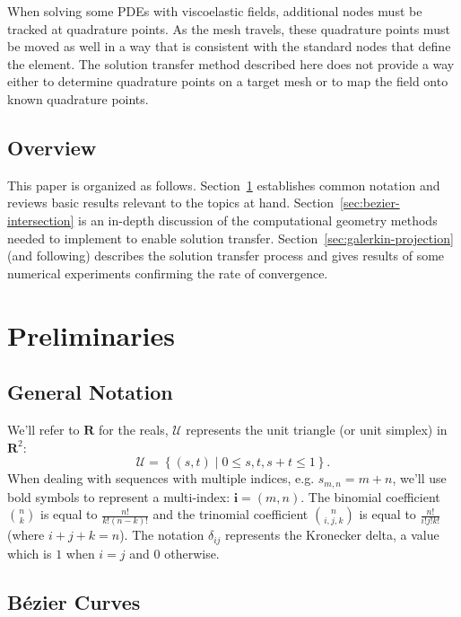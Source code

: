 \documentclass[letterpaper,10pt]{article}
\theoremstyle{definition}
\newcommand{\reals}{\mathbf{R}}
\newcommand{\utri}{\mathcal{U}}
\begin{document}
When solving some PDEs with viscoelastic fields, additional nodes must be
tracked at quadrature points. As the mesh travels, these quadrature points
must be moved as well in a way that is consistent with the standard
nodes that define the element. The solution transfer method described here
does not provide a way either to determine quadrature points on a
target mesh or to map the field onto known quadrature points.

\subsection{Overview}

This paper is organized as follows. Section~\ref{sec:preliminaries}
establishes common notation and reviews basic results relevant to the
topics at hand. Section~\ref{sec:bezier-intersection} is an
in-depth discussion of the computational geometry methods needed
to implement to enable solution transfer. Section~\ref{sec:galerkin-projection}
(and following)
describes the solution transfer process and gives results of some
numerical experiments confirming the rate of convergence.

\section{Preliminaries}\label{sec:preliminaries}

\subsection{General Notation}

We'll refer to \(\reals\) for the reals, \(\utri\) represents
the unit triangle (or unit simplex) in \(\reals^2\):
\begin{equation}
\utri = \left\{(s, t) \mid 0 \leq s, t, s + t \leq 1\right\}.
\end{equation}
When dealing with sequences with multiple indices, e.g.
\(s_{m, n} = m + n\), we'll use bold symbols to represent
a multi-index: \(\bm{i} = (m, n)\).
The binomial coefficient
\(\binom{n}{k}\) is equal to \(\frac{n!}{k! (n - k)!}\) and the trinomial
coefficient \(\binom{n}{i, j, k}\) is equal to \(\frac{n!}{i! j! k!}\)
(where \(i + j + k = n\)). The notation \(\delta_{ij}\) represents the
Kronecker delta, a value which is \(1\) when \(i = j\) and \(0\)
otherwise.

\subsection{B\'{e}zier Curves}
\end{document}
